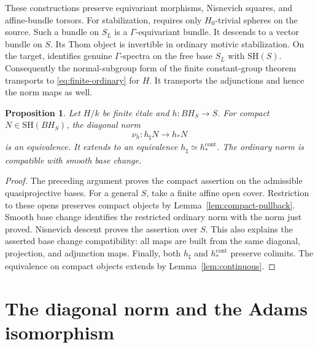 \documentclass[11pt,reqno]{amsart}
\newtheorem{proposition}[theorem]{Proposition}
\theoremstyle{definition}
\theoremstyle{remark}
\theoremstyle{plain}
\numberwithin{equation}{section}
\newcommand{\SH}{\mathrm{SH}}
\newcommand{\cont}{\mathrm{cont}}
\begin{document}
These constructions preserve equivariant morphisms, Nisnevich squares, and affine-bundle torsors.
For stabilization, \cite[Theorem~5.2]{GH} requires only \(H_0\)-trivial spheres on the source.
Such a bundle on \(S_L\) is a \(\Gamma\)-equivariant bundle.
It descends to a vector bundle on \(S\).
Its Thom object is invertible in ordinary motivic stabilization.
On the target, \cite[Remark~5.3]{GH} identifies genuine \(\Gamma\)-spectra on the free base \(S_L\) with \(\SH(S)\).
Consequently the normal-subgroup form of the finite constant-group theorem transports to \eqref{eq:finite-ordinary} for \(H\).
It transports the adjunctions and hence the norm maps as well.

\begin{proposition}\label{prop:finite-adams}
Let \(H/k\) be finite étale and \(h:BH_S\to S\).
For compact \(N\in\SH(BH_S)\), the diagonal norm
\[
 \nu_h:h_\sharp N\longrightarrow h_*N
\]
is an equivalence.
It extends to an equivalence \(h_\sharp\simeq h_*^{\cont}\).
The ordinary norm is compatible with smooth base change.
\end{proposition}
\begin{proof}
The preceding argument proves the compact assertion on the admissible quasiprojective bases.
For a general \(S\), take a finite affine open cover.
Restriction to these opens preserves compact objects by Lemma~\ref{lem:compact-pullback}.
Smooth base change identifies the restricted ordinary norm with the norm just proved.
Nisnevich descent proves the assertion over \(S\).
This also explains the asserted base change compatibility: all maps are built from the same diagonal, projection, and adjunction maps.
Finally, both \(h_\sharp\) and \(h_*^{\cont}\) preserve colimits.
The equivalence on compact objects extends by Lemma~\ref{lem:continuous}.
\end{proof}



\section{The diagonal norm and the Adams isomorphism}\label{sec:norm}
\end{document}
